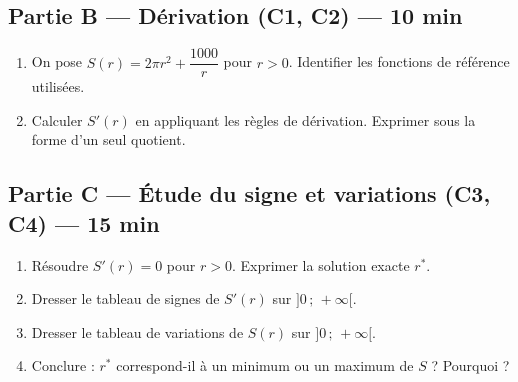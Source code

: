 
\bigskip

\subsection*{Partie B — Dérivation (C1, C2) — 10 min}

\begin{enumerate}[resume]
  \item On pose $S(r) = 2\pi r^2 + \dfrac{1000}{r}$ pour $r > 0$. Identifier les fonctions de référence utilisées.
  \item Calculer $S'(r)$ en appliquant les règles de dérivation. Exprimer sous la forme d'un seul quotient.
\end{enumerate}


\bigskip

\subsection*{Partie C — Étude du signe et variations (C3, C4) — 15 min}

\begin{enumerate}[resume]
  \item Résoudre $S'(r) = 0$ pour $r > 0$. Exprimer la solution exacte $r^*$.
  \item Dresser le tableau de signes de $S'(r)$ sur $]0\,;\,+\infty[$.
  \item Dresser le tableau de variations de $S(r)$ sur $]0\,;\,+\infty[$.
  \item Conclure : $r^*$ correspond-il à un minimum ou un maximum de $S$ ? Pourquoi ?
\end{enumerate}

